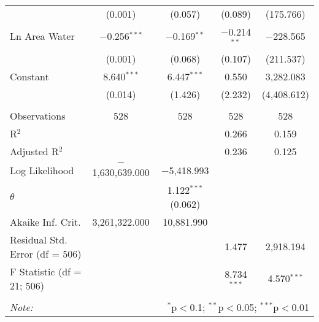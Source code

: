 \begin{table}[!htbp]
\begin{tabular}{@{\extracolsep{5pt}}lcccc}
  & (0.001) & (0.057) & (0.089) & (175.766) \\ 
  Ln Area Water & $-$0.256$^{***}$ & $-$0.169$^{**}$ & $-$0.214$^{**}$ & $-$228.565 \\ 
  & (0.001) & (0.068) & (0.107) & (211.537) \\ 
  Constant & 8.640$^{***}$ & 6.447$^{***}$ & 0.550 & 3,282.083 \\ 
  & (0.014) & (1.426) & (2.232) & (4,408.612) \\ 
 \hline \\[-1.8ex] 
Observations & 528 & 528 & 528 & 528 \\ 
R$^{2}$ &  &  & 0.266 & 0.159 \\ 
Adjusted R$^{2}$ &  &  & 0.236 & 0.125 \\ 
Log Likelihood & $-$1,630,639.000 & $-$5,418.993 &  &  \\ 
$\theta$ &  & 1.122$^{***}$  (0.062) &  &  \\ 
Akaike Inf. Crit. & 3,261,322.000 & 10,881.990 &  &  \\ 
Residual Std. Error (df = 506) &  &  & 1.477 & 2,918.194 \\ 
F Statistic (df = 21; 506) &  &  & 8.734$^{***}$ & 4.570$^{***}$ \\ 
\hline 
\hline \\[-1.8ex] 
\textit{Note:}  & \multicolumn{4}{r}{$^{*}$p$<$0.1; $^{**}$p$<$0.05; $^{***}$p$<$0.01} \\ 
\end{tabular} 
\end{table} 

